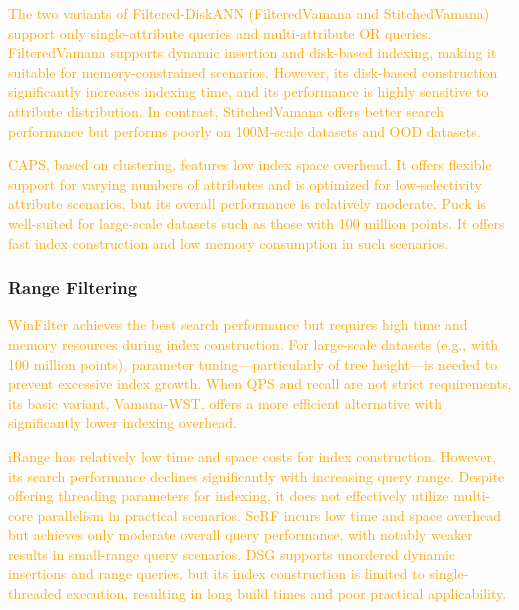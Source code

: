 \documentclass[sigconf, nonacm]{acmart}
\begin{document}
{\textcolor{orange}{The two variants of Filtered-DiskANN (FilteredVamana and StitchedVamana) support only single-attribute queries and multi-attribute OR queries. FilteredVamana supports dynamic insertion and disk-based indexing, making it suitable for memory-constrained scenarios. However, its disk-based construction significantly increases indexing time, and its performance is highly sensitive to attribute distribution. In contrast, StitchedVamana offers better search performance but performs poorly on 100M-scale datasets and OOD datasets.}

\textcolor{orange}{
CAPS, based on clustering, features low index space overhead. It offers flexible support for varying numbers of attributes and is optimized for low-selectivity attribute scenarios, but its overall performance is relatively moderate.
Puck is well-suited for large-scale datasets such as those with 100 million points. It offers fast index construction and low memory consumption in such scenarios. 
}


	\subsubsection{Range Filtering}
\textcolor{orange}{
	WinFilter achieves the best search performance but requires high time and memory resources during index construction. For large-scale datasets (e.g., with 100 million points), parameter tuning—particularly of tree height—is needed to prevent excessive index growth. When QPS and recall are not strict requirements, its basic variant, Vamana-WST, offers a more efficient alternative with significantly lower indexing overhead.
		}
	
	\textcolor{orange}{
	iRange has relatively low time and space costs for index construction. However, its search performance declines significantly with increasing query range. Despite offering threading parameters for indexing, it does not effectively utilize multi-core parallelism in practical scenarios.
	SeRF incurs low time and space overhead but achieves only moderate overall query performance, with notably weaker results in small-range query scenarios.
	DSG supports unordered dynamic insertions and range queries, but its index construction is limited to single-threaded execution, resulting in long build times and poor practical applicability.}
	
}
\end{document}
